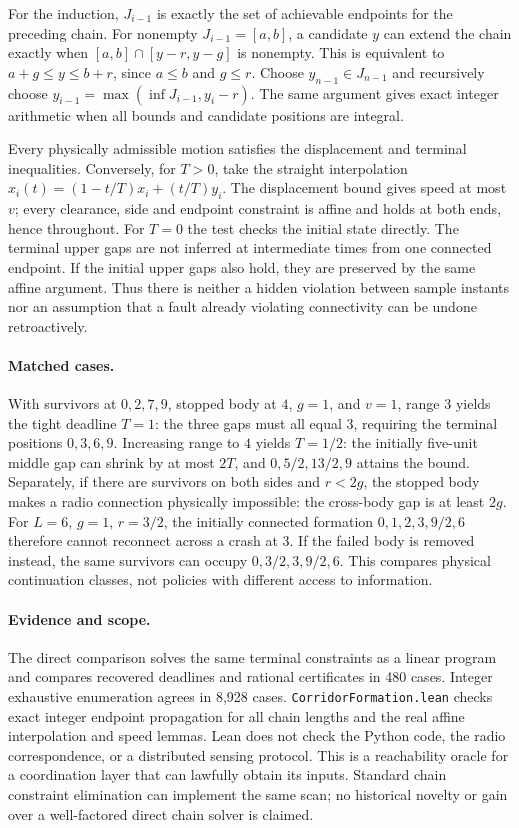 \documentclass[11pt]{article}
\begin{document}
For the induction, \(J_{i-1}\) is exactly the set of achievable endpoints
for the preceding chain. For nonempty \(J_{i-1}=[a,b]\), a candidate \(y\)
can extend the chain exactly when
\([a,b]\cap[y-r,y-g]\) is nonempty. This is equivalent to
\(a+g\leq y\leq b+r\), since \(a\leq b\) and \(g\leq r\).
Choose \(y_{n-1}\in J_{n-1}\) and recursively choose
\(y_{i-1}=\max(\inf J_{i-1},y_i-r)\). The same argument gives exact
integer arithmetic when all bounds and candidate positions are integral.

Every physically admissible motion satisfies the displacement and
terminal inequalities. Conversely, for \(T>0\), take the straight
interpolation \(x_i(t)=(1-t/T)x_i+(t/T)y_i\). 
The displacement bound gives speed at most \(v\); every clearance,
side and endpoint constraint is affine and holds at both ends, hence
throughout. For \(T=0\) the test checks the initial state directly.
The terminal upper gaps are not inferred at intermediate times from
one connected endpoint. If the initial upper gaps also hold, they are
preserved by the same affine argument. Thus there is neither a hidden
violation between sample instants nor an assumption that a fault
already violating connectivity can be undone retroactively.

\paragraph{Matched cases.} With survivors at \(0,2,7,9\), stopped body
at \(4\), \(g=1\), and \(v=1\), range \(3\) yields the tight deadline
\(T=1\): the three gaps must all equal \(3\), requiring the terminal
positions \(0,3,6,9\). Increasing range to \(4\) yields \(T=1/2\):
the initially five-unit middle gap can shrink by at most \(2T\), and
\(0,5/2,13/2,9\) attains the bound. Separately, if there are survivors on
both sides and \(r<2g\), the stopped body makes a radio connection
physically impossible: the cross-body gap is at least \(2g\).
For \(L=6\), \(g=1\), \(r=3/2\), the initially connected formation
\(0,1,2,3,9/2,6\) therefore cannot reconnect across a crash at \(3\).
If the failed body is removed instead, the same survivors can occupy
\(0,3/2,3,9/2,6\). This compares physical continuation classes, not
policies with different access to information.

\paragraph{Evidence and scope.} The direct comparison solves the same
terminal constraints as a linear program and compares recovered
deadlines and rational certificates in 480 cases. Integer exhaustive
enumeration agrees in 8,928 cases. \texttt{CorridorFormation.lean}
checks exact integer endpoint propagation for all chain lengths and
the real affine interpolation and speed lemmas. Lean does not check
the Python code, the radio correspondence, or a distributed sensing
protocol. This is a reachability oracle for a coordination layer that
can lawfully obtain its inputs. Standard chain constraint elimination
can implement the same scan; no historical novelty or gain over a
well-factored direct chain solver is claimed.
\end{document}
